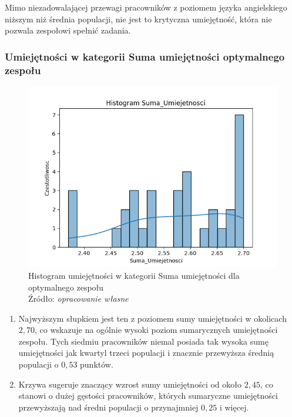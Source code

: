         \par Mimo niezadowalającej przewagi pracowników z poziomem języka angielskiego niższym niż średnia populacji, nie jest to krytyczna umiejętność, która nie pozwala zespołowi spełnić zadania.
        
        \subsubsection{Umiejętności w kategorii Suma umiejętności optymalnego zespołu}
        \begin{figure}[H]
            \centering
            \includegraphics[width=\linewidth]{chapters/Images/hist_suma_optimal.png}
            \cprotect\caption{Histogram umiejętności w kategorii Suma umiejętności dla optymalnego zespołu\\ Źródło:\textit{ opracowanie własne}}
            \label{fig:hist_suma_optimal}
        \end{figure}

        \begin{enumerate}
            \item Najwyższym słupkiem jest ten z poziomem sumy umiejętności w okolicach $2,70$, co wskazuje na ogólnie wysoki poziom sumarycznych umiejętności zespołu. Tych siedmiu pracowników niemal posiada tak wysoka sumę umiejętności jak kwartyl trzeci populacji i znacznie przewyższa średnią populacji o $0,53$ punktów.
            \item Krzywa sugeruje znaczący wzrost sumy umiejętności od około $2,45$, co stanowi o dużej gęstości pracowników, których sumaryczne umiejętności przewyższają nad średni populacji o przynajmniej $0,25$ i więcej.
        \end{enumerate}

